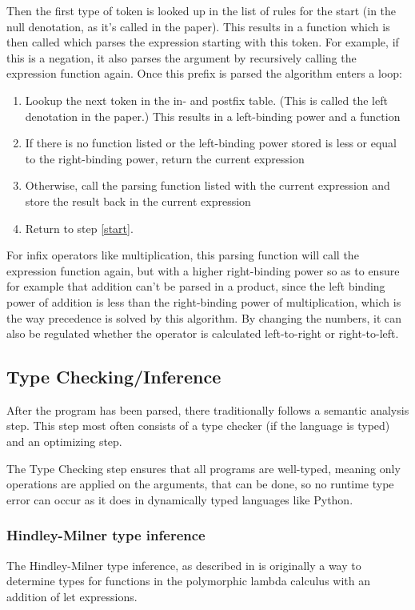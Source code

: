 \documentclass[12pt]{article}
\begin{document}
Then the first type of token is looked up
in the list of rules for the start
(in the null denotation, as it's called in the paper).
This results in a function which is then called
which parses the expression starting with this token.
For example, if this is a negation, it also parses the argument
by recursively calling the expression function again.
Once this prefix is parsed the algorithm enters a loop:
\begin{enumerate}
      \item \label{start}
            Lookup the next token in the in- and postfix table.
            (This is called the left denotation in the paper.)
            This results in a left-binding power and a function
      \item If there is no function listed or
            the left-binding power stored is less or equal
            to the right-binding power, return the current expression
      \item Otherwise, call the parsing function listed with the current expression
            and store the result back in the current expression
      \item Return to step \ref{start}.
\end{enumerate}
For infix operators like multiplication, this parsing function
will call the expression function again, but with a higher right-binding power
so as to ensure for example that addition can't be parsed in a product,
since the left binding power of addition is less than
the right-binding power of multiplication,
which is the way precedence is solved by this algorithm.
By changing the numbers, it can also be regulated whether the operator
is calculated left-to-right or right-to-left.

\subsection{Type Checking/Inference}
After the program has been parsed, there traditionally follows
a semantic analysis step. This step most often consists of a type checker
(if the language is typed) and an optimizing step.

The Type Checking step ensures that all programs are well-typed,
meaning only operations are applied on the arguments, that can
be done, so no runtime type error can occur as it does in dynamically typed
languages like Python.

\subsubsection{Hindley-Milner type inference}
The Hindley-Milner type inference, as described in
\cite{damasPrincipalTypeschemesFunctional1982}
is originally a way to determine types for functions in the
polymorphic lambda calculus with an addition of let expressions.
\end{document}
